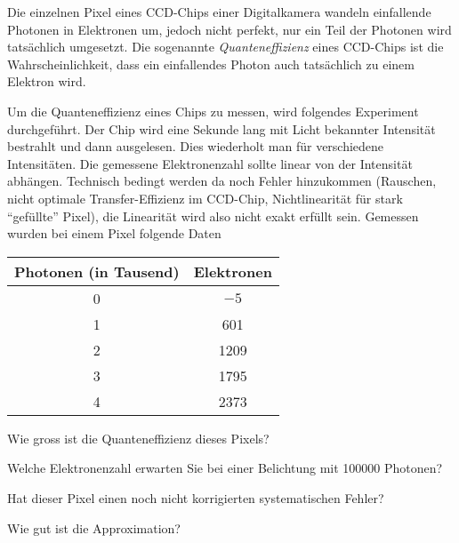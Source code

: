 Die einzelnen Pixel eines CCD-Chips einer Digitalkamera wandeln einfallende
Photonen in Elektronen um, jedoch nicht perfekt, nur ein Teil der Photonen
wird tatsächlich umgesetzt. Die sogenannte {\it Quanteneffizienz} eines
CCD-Chips ist die Wahrscheinlichkeit, dass ein einfallendes Photon
auch tatsächlich zu einem Elektron wird.

Um die Quanteneffizienz eines Chips zu messen, wird folgendes Experiment
durchgeführt.
Der Chip wird eine Sekunde lang mit Licht bekannter
Intensität bestrahlt und dann ausgelesen.
Dies wiederholt man für verschiedene Intensitäten.
Die gemessene Elektronenzahl sollte linear von der Intensität abhängen.
Technisch bedingt werden da noch Fehler hinzukommen
(Rauschen, nicht optimale Transfer-Effizienz im CCD-Chip,
Nichtlinearität für stark ``gefüllte'' Pixel),
die Linearität wird also nicht exakt erfüllt sein.
Gemessen wurden bei einem Pixel folgende Daten
\begin{center}
\begin{tabular}{|c|c|}
\hline
Photonen (in Tausend)&Elektronen\\
\hline
0&$-5$\\
1&601\\
2&1209\\
3&1795\\
4&2373\\
\hline
\end{tabular}
\end{center}
\begin{teilaufgaben}
\item
Wie gross ist die Quanteneffizienz dieses Pixels?
\item
Welche Elektronenzahl erwarten Sie bei einer Belichtung mit
100000 Photonen?
\item
Hat dieser Pixel einen noch nicht korrigierten systematischen Fehler?
\item
Wie gut ist die Approximation?
\end{teilaufgaben}


